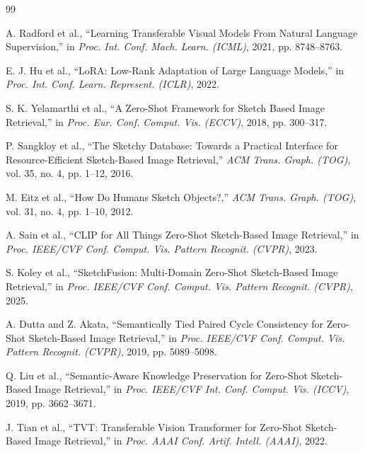 \documentclass[12pt,a4paper]{report}
\begin{document}
\begin{thebibliography}{99}

 A. Radford et al., ``Learning Transferable Visual Models From Natural Language Supervision,'' in \textit{Proc. Int. Conf. Mach. Learn. (ICML)}, 2021, pp. 8748--8763.

 E. J. Hu et al., ``LoRA: Low-Rank Adaptation of Large Language Models,'' in \textit{Proc. Int. Conf. Learn. Represent. (ICLR)}, 2022.

 S. K. Yelamarthi et al., ``A Zero-Shot Framework for Sketch Based Image Retrieval,'' in \textit{Proc. Eur. Conf. Comput. Vis. (ECCV)}, 2018, pp. 300--317.

 P. Sangkloy et al., ``The Sketchy Database: Towards a Practical Interface for Resource-Efficient Sketch-Based Image Retrieval,'' \textit{ACM Trans. Graph. (TOG)}, vol. 35, no. 4, pp. 1--12, 2016.

 M. Eitz et al., ``How Do Humans Sketch Objects?,'' \textit{ACM Trans. Graph. (TOG)}, vol. 31, no. 4, pp. 1--10, 2012.

 A. Sain et al., ``CLIP for All Things Zero-Shot Sketch-Based Image Retrieval,'' in \textit{Proc. IEEE/CVF Conf. Comput. Vis. Pattern Recognit. (CVPR)}, 2023.

 S. Koley et al., ``SketchFusion: Multi-Domain Zero-Shot Sketch-Based Image Retrieval,'' in \textit{Proc. IEEE/CVF Conf. Comput. Vis. Pattern Recognit. (CVPR)}, 2025.

 A. Dutta and Z. Akata, ``Semantically Tied Paired Cycle Consistency for Zero-Shot Sketch-Based Image Retrieval,'' in \textit{Proc. IEEE/CVF Conf. Comput. Vis. Pattern Recognit. (CVPR)}, 2019, pp. 5089--5098.

 Q. Liu et al., ``Semantic-Aware Knowledge Preservation for Zero-Shot Sketch-Based Image Retrieval,'' in \textit{Proc. IEEE/CVF Int. Conf. Comput. Vis. (ICCV)}, 2019, pp. 3662--3671.

 J. Tian et al., ``TVT: Transferable Vision Transformer for Zero-Shot Sketch-Based Image Retrieval,'' in \textit{Proc. AAAI Conf. Artif. Intell. (AAAI)}, 2022.

\end{thebibliography}
\end{document}
